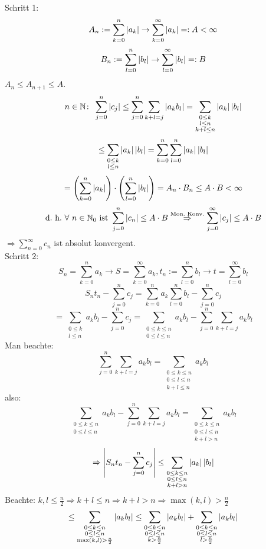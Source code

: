 \documentclass[../ana1.tex]{subfiles}
\begin{document}
\begin{bew}
    Schritt 1: 
    \[ A_n := \sum_{k=0}^n \left|a_k\right| \rightarrow \sum_{k=0}^\infty \left|a_k\right| =: A < \infty \]
    \[ B_n := \sum_{l=0}^n \left|b_l\right| \rightarrow \sum_{l=0}^\infty|b_l| =: B \]
    \( A_n \leq A_{n+1} \leq A \).
    \[ n\in\mathbb{N} \colon \; \sum_{j=0}^n \left|c_j\right| \leq \sum_{j=0}^n \sum_{k+l=j} \left|a_k b_l\right| = \sum_{\substack{0\leq k \\ l\leq n \\ k+l\leq n}} \left|a_k\right|\left|b_l\right| \]
    \[ \leq \sum_{\substack{0\leq k \\ l\leq n}} \left|a_k\right| \left|b_l\right| = \sum_{k=0}^n \sum_{l=0}^n \left|a_k\right| \left|b_l\right| \]
    \[ = \left( \sum_{k=0}^n \left|a_k\right| \right) \cdot \left( \sum_{l=0}^n \left|b_l\right| \right) = A_n \cdot B_n \leq A \cdot B < \infty \]
    \[ \text{d.\ h.\ } \forall \, n\in\N_0 \text{ ist } \sum_{j=0}^n \abs{c_n} \leq A \cdot B \overset{\text{Mon.\ Konv.}}{\Rightarrow} \sum_{j=0}^\infty \abs{c_j} \leq A \cdot B \]
    \( \Rightarrow \sum_{n=0}^\infty c_n \) ist absolut konvergent. \\
    Schritt 2:
    \[ S_n = \sum_{k=0}^n a_k \rightarrow S = \sum_{k=0}^\infty a_k, t_n := \sum_{l=0}^n b_l \rightarrow t = \sum_{l=0}^\infty b_l \]
    \[ S_n t_n - \sum_{j=0}^n c_j = \sum_{k=0}^n a_k \sum_{l=0}^n b_l - \sum_{j=0}^n c_j \]
    \[ = \sum_{\substack{0\leq k \\ l\leq n}} a_k b_l - \sum_{j=0}^n c_j = \sum_{\substack{0\leq k \leq n \\ 0\leq l \leq n}} a_k b_l - \sum_{j=0}^n \sum_{k+l=j} a_k b_l\]
    Man beachte:
    \[\sum_{j=0}^n \sum_{k+l=j} a_k b_l = \sum_{\substack{0\leq k \leq n \\ 0\leq l \leq n \\ k+l\leq n}} a_k b_l\]
    also:
    \[\sum_{\substack{0\leq k \leq n \\ 0\leq l \leq n}} a_k b_l - \sum_{j=0}^n \sum_{k+l=j} a_k b_l = \sum_{\substack{0\leq k \leq n \\ 0\leq l \leq n \\ k+l>n}} a_k b_l \]
    \[\Rightarrow \left| S_n t_n - \sum_{j=0}^n c_j \right| \leq \sum_{\substack{0\leq k\leq n \\ 0\leq l \leq n \\ k+l>n}} \left|a_k\right|\left|b_l\right|\]
    Beachte: \( k,l \leq \frac{n}{2} \Rightarrow k + l \leq n \Rightarrow k + l > n \Rightarrow \max(k,l) > \frac{n}{2} \)
    \[ \leq \sum_{\substack{0\leq k\leq n \\ 0\leq l \leq n \\ \max(k,l) > \frac{n}{2}}} \left|a_k b_l\right| \leq \sum_{\substack{0\leq k\leq n \\ 0\leq l \leq n \\ k > \frac{n}{2}}} \left|a_k b_l\right| + \sum_{\substack{0\leq k\leq n \\ 0\leq l \leq n \\ l>\frac{n}{2}}} \left|a_k b_l\right| \]

\end{bew}
\end{document}
